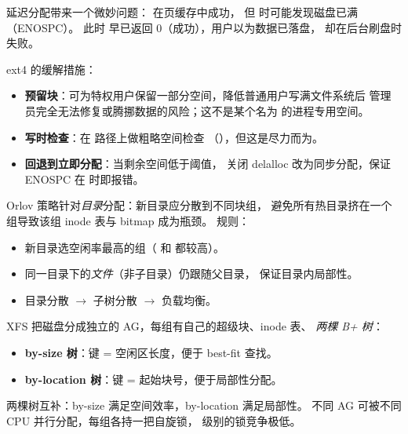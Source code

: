 \begin{filesystemlayout}

\begin{warningbox}
延迟分配带来一个微妙问题： 在页缓存中成功，
但  时可能发现磁盘已满（ENOSPC）。
此时  早已返回 0（成功），用户以为数据已落盘，
却在后台刷盘时失败。
\end{warningbox}

ext4 的缓解措施：
\begin{itemize}\tightlist
\item \textbf{预留块}：可为特权用户保留一部分空间，降低普通用户写满文件系统后
  管理员完全无法修复或腾挪数据的风险；这不是某个名为  的进程专用空间。
\item \textbf{写时检查}：在  路径上做粗略空间检查
  （），但这是尽力而为。
\item \textbf{回退到立即分配}：当剩余空间低于阈值，
  关闭 delalloc 改为同步分配，保证 ENOSPC 在  时即报错。
\end{itemize}


Orlov 策略针对\emph{目录}分配：新目录应分散到不同块组，
避免所有热目录挤在一个组导致该组 inode 表与 bitmap 成为瓶颈。
规则：

\begin{itemize}\tightlist
\item 新目录选空闲率最高的组（ 和  都较高）。
\item 同一目录下的\emph{文件}（非子目录）仍跟随父目录，
  保证目录内局部性。
\item 目录分散 $\rightarrow$ 子树分散 $\rightarrow$ 负载均衡。
\end{itemize}


XFS 把磁盘分成独立的 AG，每组有自己的超级块、inode 表、
\emph{两棵 B+ 树}：
\begin{itemize}\tightlist
\item \textbf{by-size 树}：键 = 空闲区长度，便于 best-fit 查找。
\item \textbf{by-location 树}：键 = 起始块号，便于局部性分配。
\end{itemize}

两棵树互补：by-size 满足空间效率，by-location 满足局部性。
不同 AG 可被不同 CPU 并行分配，每组各持一把自旋锁，
 级别的锁竞争极低。



\end{filesystemlayout}
